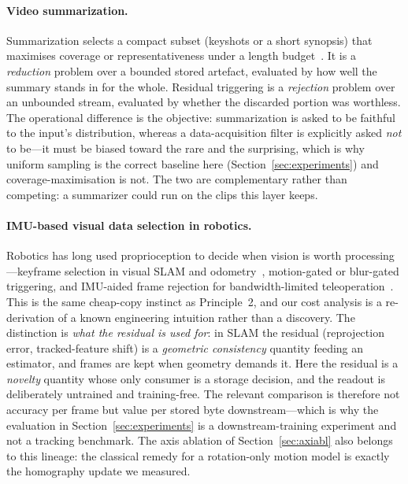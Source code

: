 \documentclass[12pt,a4paper]{article}
\begin{document}
\paragraph{Video summarization.}
Summarization selects a compact subset (keyshots or a short synopsis) that maximises coverage or representativeness under a length budget~\cite{gygli2014,arev2019}. It is a \emph{reduction} problem over a bounded stored artefact, evaluated by how well the summary stands in for the whole. Residual triggering is a \emph{rejection} problem over an unbounded stream, evaluated by whether the discarded portion was worthless. The operational difference is the objective: summarization is asked to be faithful to the input's distribution, whereas a data-acquisition filter is explicitly asked \emph{not} to be---it must be biased toward the rare and the surprising, which is why uniform sampling is the correct baseline here (Section~\ref{sec:experiments}) and coverage-maximisation is not. The two are complementary rather than competing: a summarizer could run on the clips this layer keeps.

\paragraph{IMU-based visual data selection in robotics.}
Robotics has long used proprioception to decide when vision is worth processing---keyframe selection in visual SLAM and odometry~\cite{murartal2015}, motion-gated or blur-gated triggering, and IMU-aided frame rejection for bandwidth-limited teleoperation~\cite{cadena2016}. This is the same cheap-copy instinct as Principle~2, and our cost analysis is a re-derivation of a known engineering intuition rather than a discovery. The distinction is \emph{what the residual is used for}: in SLAM the residual (reprojection error, tracked-feature shift) is a \emph{geometric consistency} quantity feeding an estimator, and frames are kept when geometry demands it. Here the residual is a \emph{novelty} quantity whose only consumer is a storage decision, and the readout is deliberately untrained and training-free. The relevant comparison is therefore not accuracy per frame but value per stored byte downstream---which is why the evaluation in Section~\ref{sec:experiments} is a downstream-training experiment and not a tracking benchmark. The axis ablation of Section~\ref{sec:axiabl} also belongs to this lineage: the classical remedy for a rotation-only motion model is exactly the homography update we measured.
\end{document}
